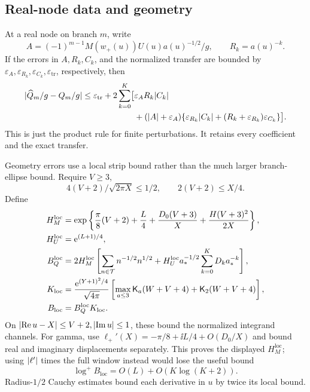 \subsection{Real-node data and geometry}
At a real node on branch \(m\), write
\[
 A=(-1)^{m-1}M(w_+(u))U(u)a(u)^{-1/2}/g,\qquad R_k=a(u)^{-k}.
\]
If the errors in \(A,R_k,C_k\), and the normalized transfer
are bounded by \(\varepsilon_A,\varepsilon_{R_k},
\varepsilon_{C_k},\varepsilon_{\mathrm{tr}}\), respectively, then
\begin{equation}
\begin{split}
 \lvert \widehat Q_m/g-Q_m/g\rvert
 \le\varepsilon_{\mathrm{tr}}+2\sum_{k=0}^K
 \bigl[&\varepsilon_A R_k\lvert C_k\rvert\\
 &+(\lvert A\rvert+\varepsilon_A)
 \{\varepsilon_{R_k}\lvert C_k\rvert
           +(R_k+\varepsilon_{R_k})\varepsilon_{C_k}\}\bigr].
\end{split}
\label{eq:node-data-error}
\end{equation}
This is just the product rule for finite perturbations.
It retains every coefficient and the exact transfer.

Geometry errors use a local strip bound rather than the much
larger branch-ellipse bound. Require \(V\ge3\),
\[
 4(V+2)/\sqrt{2\pi X}\le1/2,\qquad 2(V+2)\le X/4.
\]
Define
\begin{subequations}\label{eq:local-strip}
\begin{align}
 H_M^{\mathrm{loc}}
 &=\exp\left\{\frac{\pi}{8}(V+2)+\frac L4+
             \frac{D_0(V+3)}X+\frac{H(V+3)^2}{2X}\right\},\\
 H_U^{\mathrm{loc}}&=\mathrm e^{(L+1)/4},\\
 B_Q^{\mathrm{loc}}
 &=2H_M^{\mathrm{loc}}\left[
       \sum_{n\in\mathcal T} n^{-1/2}n^{1/2}
       +H_U^{\mathrm{loc}}a_*^{-1/2}\sum_{k=0}^KD_ka_*^{-k}\right],\\
 K_{\mathrm{loc}}
 &=\frac{\mathrm e^{(Y+1)^2/4}}{\sqrt{4\pi}}
       \left[\max_{a\le3}\mathsf K_a(W+V+4)
                         +\mathsf K_2(W+V+4)\right],\\
 B_{\mathrm{loc}}&=B_Q^{\mathrm{loc}}K_{\mathrm{loc}}.
\end{align}
\end{subequations}
On \(\lvert \operatorname{Re} u-X\rvert\le V+2,\lvert \operatorname{Im} u\rvert\le1\), these bound
the normalized integrand channels. For gamma, use
\(\ell_+'(X)=-\pi/8+\ii L/4+O(D_0/X)\) and bound real and
imaginary displacements separately. This proves the displayed
\(H_M^{\mathrm{loc}}\); using \(\lvert \ell'\rvert\) times the full
window instead would lose the useful bound
\[
 \log^+B_{\mathrm{loc}}=O(L)+O(K\log(K+2)).
 \label{eq:local-strip-growth}
\]
Radius-\(1/2\) Cauchy estimates bound each derivative in \(u\)
by twice its local bound.

